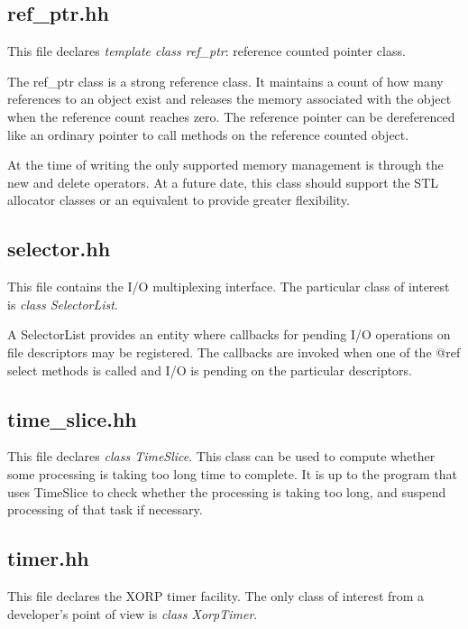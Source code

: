 \documentclass[11pt]{article}
\begin{document}
\subsection{ref\_ptr.hh}

This file declares \emph{template class ref\_ptr}: reference counted
pointer class. 

The ref\_ptr class is a strong reference class.  It maintains a count of
how many references to an object exist and releases the memory associated
with the object when the reference count reaches zero.  The reference
pointer can be dereferenced like an ordinary pointer to call methods
on the reference counted object.

At the time of writing the only supported memory management is
through the new and delete operators.  At a future date, this class
should support the STL allocator classes or an equivalent to
provide greater flexibility.

\subsection{selector.hh}

This file contains the I/O multiplexing interface. The particular class
of interest is \emph{class SelectorList}.

A SelectorList provides an entity where callbacks for pending I/O
operations on file descriptors may be registered.  The callbacks
are invoked when one of the @ref select methods is called and I/O
is pending on the particular descriptors.
 

\subsection{time\_slice.hh}

This file declares \emph{class TimeSlice}.
This class can be used to compute whether some processing is taking
too long time to complete. It is up to the program that uses
TimeSlice to check whether the processing is taking too long,
and suspend processing of that task if necessary.

\subsection{timer.hh}

This file declares the XORP timer facility. The only class of interest
from a developer's point of view is \emph{class XorpTimer}.
\end{document}
